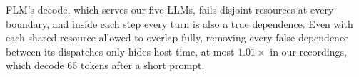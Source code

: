 FLM's decode, which serves our five LLMs, fails disjoint resources at every boundary, and inside each step every turn is also a true dependence.
Even with each shared resource allowed to overlap fully, removing every false dependence between its dispatches only hides host time, at most $1.01\times$ in our recordings, which decode 65 tokens after a short prompt.

